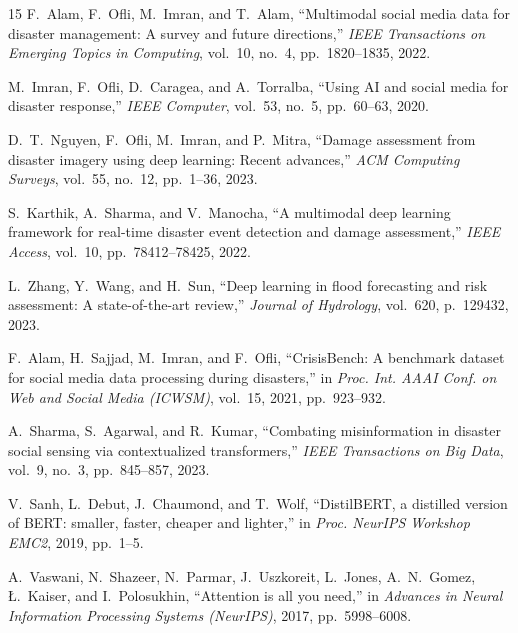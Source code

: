 \documentclass{article}
\begin{document}
\clearpage
\begin{thebibliography}{15}
F.~Alam, F.~Ofli, M.~Imran, and T.~Alam, ``Multimodal social media data for disaster management: A survey and future directions,'' \textit{IEEE Transactions on Emerging Topics in Computing}, vol.~10, no.~4, pp.~1820--1835, 2022.

M.~Imran, F.~Ofli, D.~Caragea, and A.~Torralba, ``Using AI and social media for disaster response,'' \textit{IEEE Computer}, vol.~53, no.~5, pp.~60--63, 2020.

D.~T.~Nguyen, F.~Ofli, M.~Imran, and P.~Mitra, ``Damage assessment from disaster imagery using deep learning: Recent advances,'' \textit{ACM Computing Surveys}, vol.~55, no.~12, pp.~1--36, 2023.

S.~Karthik, A.~Sharma, and V.~Manocha, ``A multimodal deep learning framework for real-time disaster event detection and damage assessment,'' \textit{IEEE Access}, vol.~10, pp.~78412--78425, 2022.

L.~Zhang, Y.~Wang, and H.~Sun, ``Deep learning in flood forecasting and risk assessment: A state-of-the-art review,'' \textit{Journal of Hydrology}, vol.~620, p.~129432, 2023.

F.~Alam, H.~Sajjad, M.~Imran, and F.~Ofli, ``CrisisBench: A benchmark dataset for social media data processing during disasters,'' in \textit{Proc. Int. AAAI Conf. on Web and Social Media (ICWSM)}, vol.~15, 2021, pp.~923--932.

A.~Sharma, S.~Agarwal, and R.~Kumar, ``Combating misinformation in disaster social sensing via contextualized transformers,'' \textit{IEEE Transactions on Big Data}, vol.~9, no.~3, pp.~845--857, 2023.

V.~Sanh, L.~Debut, J.~Chaumond, and T.~Wolf, ``DistilBERT, a distilled version of BERT: smaller, faster, cheaper and lighter,'' in \textit{Proc. NeurIPS Workshop EMC2}, 2019, pp.~1--5.

A.~Vaswani, N.~Shazeer, N.~Parmar, J.~Uszkoreit, L.~Jones, A.~N.~Gomez, \L.~Kaiser, and I.~Polosukhin, ``Attention is all you need,'' in \textit{Advances in Neural Information Processing Systems (NeurIPS)}, 2017, pp.~5998--6008.


\end{thebibliography}
\end{document}
